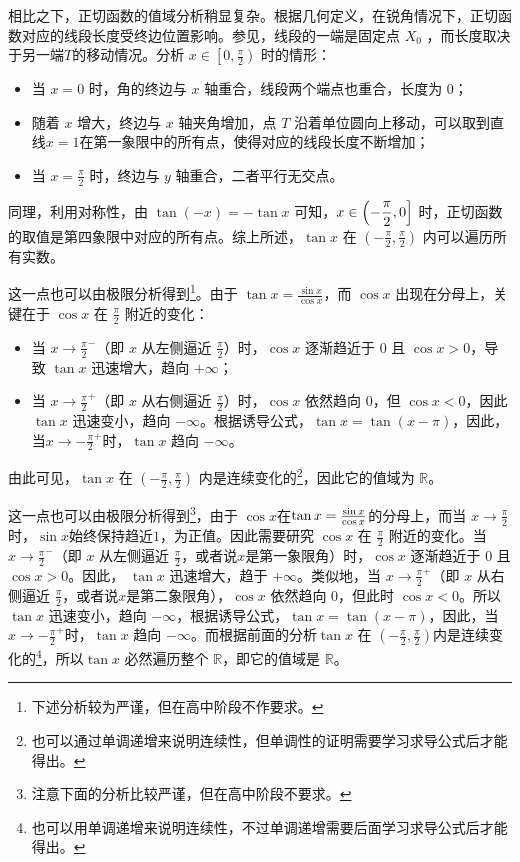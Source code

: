 相比之下，正切函数的值域分析稍显复杂。根据几何定义，在锐角情况下，正切函数对应的线段长度受终边位置影响。参见，线段的一端是固定点 $X_0$ ，而长度取决于另一端$T$的移动情况。分析 $\displaystyle x\in\left[0,\frac{\pi}{2}\right)$ 时的情形：
\begin{itemize}
\item 当 $x=0$ 时，角的终边与 $x$ 轴重合，线段两个端点也重合，长度为 $0$；
\item 随着 $x$ 增大，终边与 $x$ 轴夹角增加，点 $T$ 沿着单位圆向上移动，可以取到直线$x=1$在第一象限中的所有点，使得对应的线段长度不断增加；
\item 当 $x=\frac{\pi}{2}$ 时，终边与 $y$ 轴重合，二者平行无交点。
\end{itemize}
同理，利用对称性，由 $\tan(-x) = -\tan x$ 可知，$\displaystyle x\in\left(-{\pi\over2},0\right]$ 时，正切函数的取值是第四象限中对应的所有点。综上所述，$\tan x$ 在 $\displaystyle \left(-\frac{\pi}{2},\frac{\pi}{2}\right)$ 内可以遍历所有实数。

这一点也可以由极限分析得到\footnote{下述分析较为严谨，但在高中阶段不作要求。}。由于 $\displaystyle\tan x = \frac{\sin x}{\cos x}$，而 $\cos x$ 出现在分母上，关键在于 $\cos x$ 在 $\displaystyle\frac{\pi}{2}$ 附近的变化：
\begin{itemize}
\item 当 $\displaystyle x \to \frac{\pi}{2}^-$（即 $x$ 从左侧逼近 $\frac{\pi}{2}$）时，$\cos x$ 逐渐趋近于 $0$ 且 $\cos x > 0$，导致 $\tan x$ 迅速增大，趋向 $+\infty$；
\item 当 $\displaystyle x \to \frac{\pi}{2}^+$（即 $x$ 从右侧逼近 $\frac{\pi}{2}$）时，$\cos x$ 依然趋向 $0$，但 $\cos x < 0$，因此 $\tan x$ 迅速变小，趋向 $-\infty$。根据诱导公式，$\tan x=\tan(x-\pi)$，因此，当$\displaystyle x \to -\frac{\pi}{2}^+$时，$\tan x$ 趋向 $-\infty$。
\end{itemize}

由此可见，$\tan x$ 在 $\displaystyle (-\frac{\pi}{2},\frac{\pi}{2})$ 内是连续变化的\footnote{也可以通过单调递增来说明连续性，但单调性的证明需要学习求导公式后才能得出。}，因此它的值域为 $\mathbb{R}$。


这一点也可以由极限分析得到\footnote{注意下面的分析比较严谨，但在高中阶段不要求。}，由于 $\cos x$在$\tan x={\sin x\over\cos x}$的分母上，而当 $x \to \frac{\pi}{2}$时，$\sin x $始终保持趋近$1$，为正值。因此需要研究 $\cos x$ 在 $\frac{\pi}{2}$ 附近的变化。当 $x \to \frac{\pi}{2}^-$（即 $x$ 从左侧逼近 $\frac{\pi}{2}$，或者说$x$是第一象限角）时，$\cos x$ 逐渐趋近于 $0$ 且 $\cos x > 0$。因此， $\tan x$ 迅速增大，趋于 $+\infty$。类似地，当 $x \to \frac{\pi}{2}^+$（即 $x$ 从右侧逼近 $\frac{\pi}{2}$，或者说$x$是第二象限角），$\cos x$ 依然趋向 $0$，但此时 $\cos x < 0$。所以 $\tan x$ 迅速变小，趋向 $-\infty$，根据诱导公式，$\tan x=\tan(x-\pi)$，因此，当$x \to -\frac{\pi}{2}^+$时，$\tan x$ 趋向 $-\infty$。而根据前面的分析$\tan x$ 在 $(-\frac{\pi}{2}, \frac{\pi}{2})$内是连续变化的\footnote{也可以用单调递增来说明连续性，不过单调递增需要后面学习求导公式后才能得出。}，所以$\tan x$ 必然遍历整个 $\mathbb{R}$，即它的值域是 $\mathbb{R}$。

